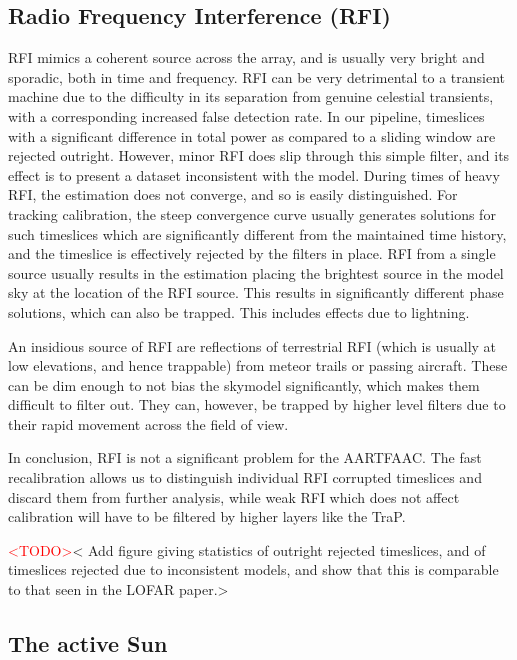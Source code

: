 \documentclass{aa}
\begin{document}
\subsection{Radio Frequency Interference (RFI)}

RFI mimics  a coherent source across the  array, and is usually  very bright and
sporadic, both in time and frequency. RFI can be very detrimental to a transient
machine  due  to  the  difficulty  in  its  separation  from  genuine  celestial
transients,  with  a  corresponding  increased  false  detection  rate.  In  our
pipeline, timeslices with a significant difference in total power as compared to
a sliding  window are rejected outright.   However, minor RFI  does slip through
this simple filter, and its effect is to present a dataset inconsistent with the
model. During  times of heavy RFI, the  estimation does not converge,  and so is
easily  distinguished.  For  tracking calibration,  the steep  convergence curve
usually  generates  solutions  for   such  timeslices  which  are  significantly
different from  the maintained  time history, and  the timeslice  is effectively
rejected by  the filters in place. RFI  from a single source  usually results in
the estimation placing the brightest source  in the model sky at the location of
the RFI source.  This results in significantly different  phase solutions, which
can also be trapped. This includes effects due to lightning.

An insidious source of RFI are  reflections of terrestrial RFI (which is usually
at  low  elevations,  and  hence   trappable)  from  meteor  trails  or  passing
aircraft. These can be dim enough  to not bias the skymodel significantly, which
makes them  difficult to  filter out.  They can, however,  be trapped  by higher
level filters due to their rapid movement across the field of view.

In conclusion,  RFI is  not a  significant problem for  the AARTFAAC.   The fast
recalibration allows  us to distinguish individual RFI  corrupted timeslices and
discard  them  from further  analysis,  while weak  RFI  which  does not  affect
calibration will have to be filtered by higher layers like the TraP.

\textcolor{red}{<TODO>}<  Add  figure  giving  statistics of  outright  rejected
timeslices, and of timeslices rejected due to inconsistent models, and show that
this is comparable to that seen in the LOFAR paper.>

\subsection{The active Sun}
\end{document}
